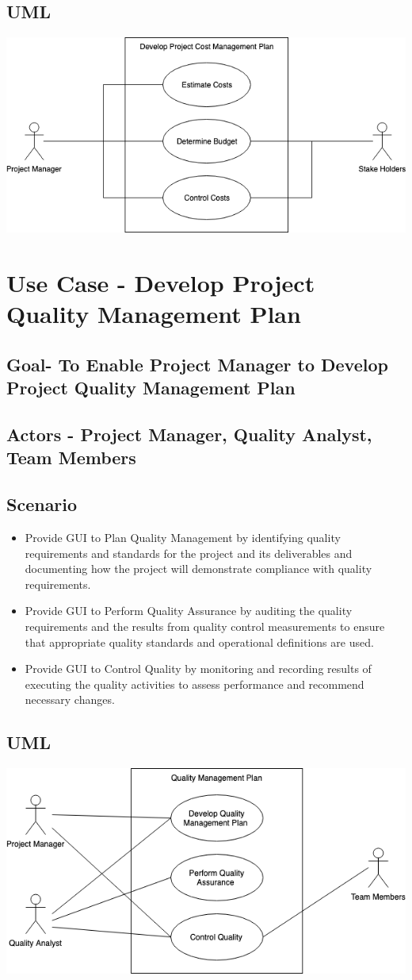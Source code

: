 \documentclass[10pt]{article}
\begin{document}
\subsection{UML}
\includegraphics[width=\textwidth]{usecase2}

\newpage
\section{Use Case - Develop Project Quality Management Plan}
\subsection{Goal- To Enable Project Manager to Develop Project Quality Management Plan}
\subsection{Actors - Project Manager, Quality Analyst, Team Members}
\subsection{Scenario}
\begin{itemize}
  \item Provide GUI to Plan Quality Management by identifying quality requirements and standards for the project and its deliverables and documenting how the project will demonstrate compliance with quality requirements.
  \item Provide GUI to Perform Quality Assurance by auditing the quality requirements and the results from quality control measurements to ensure that appropriate quality standards and operational definitions are used.
  \item Provide GUI to Control Quality by monitoring and recording results of executing the quality activities to assess performance and recommend necessary changes.
  
\end{itemize}

\subsection{UML}
\includegraphics[width=\textwidth]{usecase3}
\end{document}
